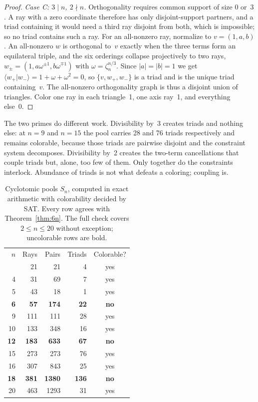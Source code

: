 \documentclass[twocolumn,prl,superscriptaddress,nofootinbib]{revtex4-2}
\newcommand{\braket}[2]{\langle#1|#2\rangle}
\begin{document}
\begin{proof}
\emph{Case C: $3\mid n$, $2\nmid n$.}  Orthogonality requires common support of
size $0$ or~$3$.  A ray with a zero coordinate therefore has only
disjoint-support partners, and a triad containing it would need a third ray
disjoint from both, which is impossible; so no triad contains such a ray.  For an
all-nonzero ray, normalize to $v=(1,a,b)$.  An all-nonzero $w$ is orthogonal
to~$v$ exactly when the three terms form an equilateral triple, and the six
orderings collapse projectively to two rays,
$w_\pm = (1,a\omega^{\pm1},b\omega^{\mp1})$ with $\omega=\zeta_n^{n/3}$.  Since
$|a|=|b|=1$ we get $\braket{w_+}{w_-} = 1+\omega+\omega^2 = 0$, so
$\{v,w_+,w_-\}$ is a triad and is the unique triad containing~$v$.  The
all-nonzero orthogonality graph is thus a disjoint union of triangles.  Color one
ray in each triangle~1, one axis ray~1, and everything else~0.
\end{proof}

\noindent The two primes do different work.  Divisibility by~3 creates triads and
nothing else: at $n=9$ and $n=15$ the pool carries 28 and 76 triads
respectively and remains colorable, because those triads are pairwise disjoint
and the constraint system decomposes.  Divisibility by~2 creates the two-term
cancellations that couple triads but, alone, too few of them.  Only together do
the constraints interlock.  Abundance of triads is not what defeats a coloring;
coupling is.

\begin{table}[t]
\caption{\label{tab:cyc}Cyclotomic pools $S_n$, computed in exact arithmetic with
colorability decided by SAT.  Every row agrees with Theorem~\ref{thm:6n}.  The
full check covers $2\leq n\leq20$ without exception; uncolorable rows are bold.}
\begin{ruledtabular}
\begin{tabular}{rrrrc}
$n$ & Rays & Pairs & Triads & Colorable? \\
\colrule
3  & 21  & 21   & 4   & yes \\
4  & 31  & 69   & 7   & yes \\
5  & 43  & 18   & 1   & yes \\
\textbf{6}  & \textbf{57}  & \textbf{174}  & \textbf{22}  & \textbf{no} \\
9  & 111 & 111  & 28  & yes \\
10 & 133 & 348  & 16  & yes \\
\textbf{12} & \textbf{183} & \textbf{633}  & \textbf{67}  & \textbf{no} \\
15 & 273 & 273  & 76  & yes \\
16 & 307 & 843  & 25  & yes \\
\textbf{18} & \textbf{381} & \textbf{1380} & \textbf{136} & \textbf{no} \\
20 & 463 & 1293 & 31  & yes \\
\end{tabular}
\end{ruledtabular}
\end{table}
\end{document}
